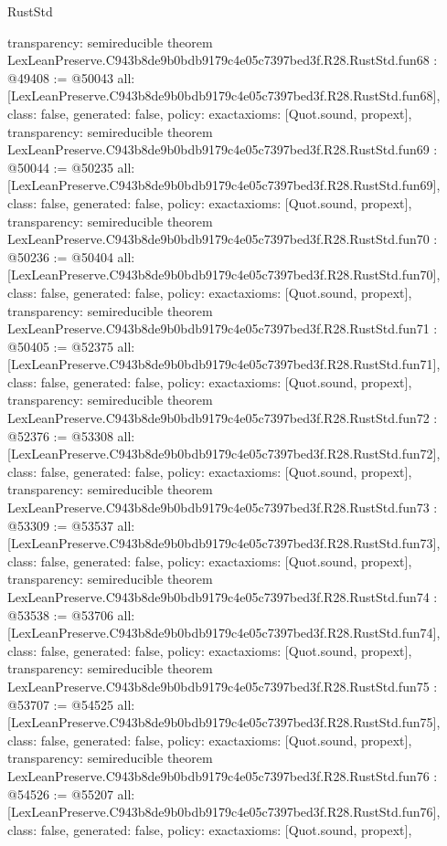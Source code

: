 \begin{lexlean}{RustStd}
\begin{coremodule}
{  transparency: semireducible
}
theorem LexLeanPreserve.C943b8de9b0bdb9179c4e05c7397bed3f.R28.RustStd.fun68 : @49408 := @50043 {
  all: [LexLeanPreserve.C943b8de9b0bdb9179c4e05c7397bed3f.R28.RustStd.fun68],
  class: false,
  generated: false,
  policy: exact{axioms: [Quot.sound, propext]},
  transparency: semireducible
}
theorem LexLeanPreserve.C943b8de9b0bdb9179c4e05c7397bed3f.R28.RustStd.fun69 : @50044 := @50235 {
  all: [LexLeanPreserve.C943b8de9b0bdb9179c4e05c7397bed3f.R28.RustStd.fun69],
  class: false,
  generated: false,
  policy: exact{axioms: [Quot.sound, propext]},
  transparency: semireducible
}
theorem LexLeanPreserve.C943b8de9b0bdb9179c4e05c7397bed3f.R28.RustStd.fun70 : @50236 := @50404 {
  all: [LexLeanPreserve.C943b8de9b0bdb9179c4e05c7397bed3f.R28.RustStd.fun70],
  class: false,
  generated: false,
  policy: exact{axioms: [Quot.sound, propext]},
  transparency: semireducible
}
theorem LexLeanPreserve.C943b8de9b0bdb9179c4e05c7397bed3f.R28.RustStd.fun71 : @50405 := @52375 {
  all: [LexLeanPreserve.C943b8de9b0bdb9179c4e05c7397bed3f.R28.RustStd.fun71],
  class: false,
  generated: false,
  policy: exact{axioms: [Quot.sound, propext]},
  transparency: semireducible
}
theorem LexLeanPreserve.C943b8de9b0bdb9179c4e05c7397bed3f.R28.RustStd.fun72 : @52376 := @53308 {
  all: [LexLeanPreserve.C943b8de9b0bdb9179c4e05c7397bed3f.R28.RustStd.fun72],
  class: false,
  generated: false,
  policy: exact{axioms: [Quot.sound, propext]},
  transparency: semireducible
}
theorem LexLeanPreserve.C943b8de9b0bdb9179c4e05c7397bed3f.R28.RustStd.fun73 : @53309 := @53537 {
  all: [LexLeanPreserve.C943b8de9b0bdb9179c4e05c7397bed3f.R28.RustStd.fun73],
  class: false,
  generated: false,
  policy: exact{axioms: [Quot.sound, propext]},
  transparency: semireducible
}
theorem LexLeanPreserve.C943b8de9b0bdb9179c4e05c7397bed3f.R28.RustStd.fun74 : @53538 := @53706 {
  all: [LexLeanPreserve.C943b8de9b0bdb9179c4e05c7397bed3f.R28.RustStd.fun74],
  class: false,
  generated: false,
  policy: exact{axioms: [Quot.sound, propext]},
  transparency: semireducible
}
theorem LexLeanPreserve.C943b8de9b0bdb9179c4e05c7397bed3f.R28.RustStd.fun75 : @53707 := @54525 {
  all: [LexLeanPreserve.C943b8de9b0bdb9179c4e05c7397bed3f.R28.RustStd.fun75],
  class: false,
  generated: false,
  policy: exact{axioms: [Quot.sound, propext]},
  transparency: semireducible
}
theorem LexLeanPreserve.C943b8de9b0bdb9179c4e05c7397bed3f.R28.RustStd.fun76 : @54526 := @55207 {
  all: [LexLeanPreserve.C943b8de9b0bdb9179c4e05c7397bed3f.R28.RustStd.fun76],
  class: false,
  generated: false,
  policy: exact{axioms: [Quot.sound, propext]},
}
\end{coremodule}
\end{lexlean}
